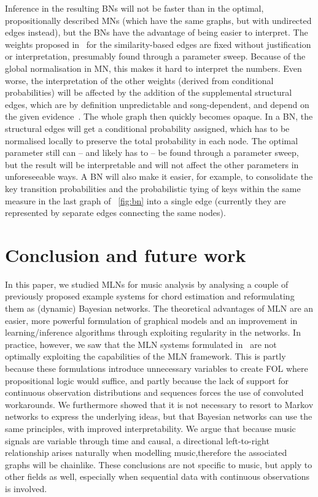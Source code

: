 \documentclass[letterpaper]{article} %
\newcommand{\figref}[1]{\figurename~\ref{fig:#1}} %
\begin{document}
Inference in the resulting BNs will not be faster than in the optimal, propositionally described MNs (which have the same graphs, but with undirected edges instead), but the BNs have the advantage of being easier to interpret. The weights proposed in~\cite{papadopoulos2017taslp} for the similarity-based edges are fixed without justification or interpretation, presumably found through a parameter sweep. Because of the global normalisation in MN, this makes it hard to interpret the numbers. Even worse, the interpretation of the other weights (derived from conditional probabilities) will be affected by the addition of the supplemental structural edges, which are by definition unpredictable and song-dependent, and depend on the given evidence~\cite{jain2011ki}. The whole graph then quickly becomes opaque. In a BN, the structural edges will get a conditional probability assigned, which has to be normalised locally to preserve the total probability in each node. The optimal parameter still can -- and likely has to -- be found through a parameter sweep, but the result will be interpretable and will not affect the other parameters in unforeseeable ways. A BN will also make it easier, for example, to consolidate the key transition probabilities and the probabilistic tying of keys within the same measure in the last graph of \figref{bn} into a single edge (currently they are represented by separate edges connecting the same nodes).








\vspace{-2.14mm}
\section{Conclusion and future work}
In this paper, we studied MLNs for music analysis by analysing a couple of previously proposed example systems for chord estimation and reformulating them as (dynamic) Bayesian networks. The theoretical advantages of MLN are an easier, more powerful formulation of graphical models and an improvement in learning/inference algorithms through exploiting regularity in the networks. In practice, however, we saw that the MLN systems formulated in~\cite{papadopoulos2012ismir,papadopoulos2013icassp,papadopoulos2017taslp} are not optimally exploiting the capabilities of the MLN framework. This is partly because these formulations introduce unnecessary variables to create FOL where propositional logic would suffice, and partly because the lack of support for continuous observation distributions and sequences forces the use of convoluted workarounds. We furthermore showed that it is not necessary to resort to Markov networks to express the underlying ideas, but that Bayesian networks can use the same principles, with improved interpretability. We argue that because music signals are variable through time and causal, a directional left-to-right relationship arises naturally when modelling music,therefore the associated graphs will be chainlike. These conclusions are not specific to music, but apply to other fields as well, especially when sequential data with continuous observations is involved.
\end{document}
